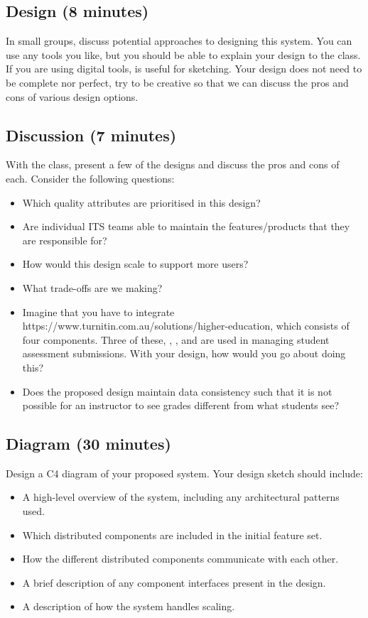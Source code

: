 \documentclass{csse4400}
\begin{document}
\subsection*{Design (8 minutes)}
In small groups, discuss potential approaches to designing this system.
You can use any tools you like,
but you should be able to explain your design to the class.
If you are using digital tools,
 is useful for sketching.
Your design does not need to be complete nor perfect,
try to be creative so that we can discuss the pros and cons of various design options.


\subsection*{Discussion (7 minutes)}
With the class, present a few of the designs and discuss the pros and cons of each.
Consider the following questions:
\begin{itemize}
\item Which quality attributes are prioritised in this design?
\item Are individual ITS teams able to maintain the features/products that they are responsible for?
\item How would this design scale to support more users?
\item What trade-offs are we making?
\item Imagine that you have to integrate 
      {https://www.turnitin.com.au/solutions/higher-education}, which consists of four components.
      Three of these, ,
      ,
      and 
      are used in managing student assessment submissions.
      With your design, how would you go about doing this?
\item Does the proposed design maintain data consistency
      such that it is not possible for an instructor to see grades different from what students see?
\end{itemize}

\subsection*{Diagram (30 minutes)}
Design a C4 diagram of your proposed system.
Your design sketch should include:
\begin{itemize}
\item A high-level overview of the system, including any architectural patterns used.
\item Which distributed components are included in the initial feature set.
\item How the different distributed components communicate with each other.
\item A brief description of any component interfaces present in the design.
\item A description of how the system handles scaling.
\end{itemize}
\end{document}
